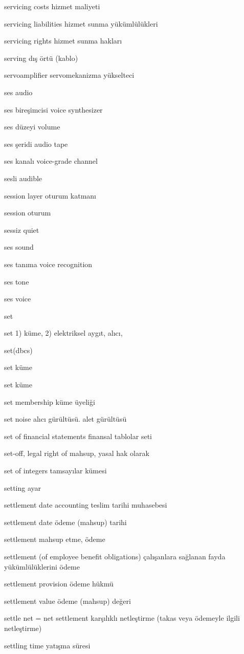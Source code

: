 \documentclass[12pt,fleqn]{article}\usepackage{../../common}
\begin{document}
servicing costs hizmet maliyeti

servicing liabilities hizmet sunma yükümlülükleri

servicing rights hizmet sunma hakları

serving dış örtü (kablo)

servoamplifier servomekanizma yükselteci

ses audio

ses bireşimcisi voice synthesizer

ses düzeyi volume

ses şeridi audio tape

ses kanalı voice-grade channel

sesli audible

session layer oturum katmanı

session oturum

sessiz quiet

ses sound

ses tanıma voice recognition

ses tone

ses voice

set

set 1) küme, 2) elektriksel aygıt, alıcı,

set(dbcs)

set küme

set küme

set membership küme üyeliği

set noise alıcı gürültüsü. alet gürültüsü

set of financial statements finansal tablolar seti

set-off, legal right of mahsup, yasal hak olarak

set of integers tamsayılar kümesi

setting ayar

settlement date accounting teslim tarihi muhasebesi

settlement date ödeme (mahsup) tarihi

settlement mahsup etme, ödeme

settlement (of employee benefit obligations) çalışanlara sağlanan fayda yükümlülüklerini ödeme

settlement provision ödeme hükmü

settlement value ödeme (mahsup) değeri

settle net = net settlement karşılıklı netleştirme (takas veya ödemeyle ilgili netleştirme)

settling time yatışma süresi
\end{document}

